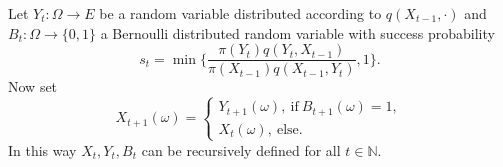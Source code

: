 \documentclass[a4paper]{article}
\begin{document}
Let $Y_t: \Omega \to E$ be a random variable distributed
 according to $q(X_{t-1}, \cdot)$ and $B_t : \Omega \to \{0,1\}$ a Bernoulli distributed random variable with
 success probability 
 \begin{equation}
    \label{eq:bernouilliproba}
    s_t = \min \bigg \{ \frac{\pi (Y_t) q(Y_t , X_{t-1})}{ \pi (X_{t-1}) q(X_{t-1}, Y_t)}, 1 \bigg \}.
 \end{equation}
Now set 
\begin{equation}
    X_{t+1}(\omega) = 
    \begin{cases}
        Y_{t+1}(\omega), \ \text{if} \ B_{t+1}(\omega) = 1, \\ 
        X_t(\omega), \ \text{else}.
    \end{cases}
\end{equation}
In this way $X_t, Y_t, B_t$ can be recursively defined for all $t \in \mathbb{N}$.
\end{document}
